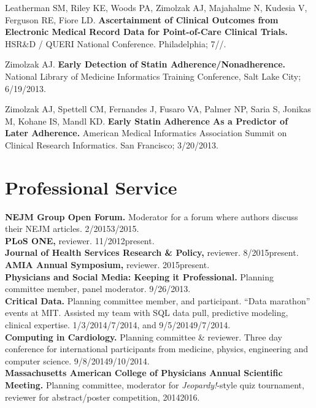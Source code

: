 \documentclass[10pt]{article}
\begin{document}
Leatherman SM, Riley KE, Woods PA, Zimolzak AJ, Majahalme N, Kudesia
V, Ferguson RE, Fiore LD. \textbf{Ascertainment of Clinical Outcomes
  from Electronic Medical Record Data for Point-of-Care Clinical
  Trials.} HSR\&D / QUERI National Conference. Philadelphia;
7/\ndash{}/.

Zimolzak AJ. \textbf{Early Detection of Statin
  Adherence/Nonadherence.} National Library of Medicine Informatics
Training Conference, Salt Lake City; 6/19/2013.

Zimolzak AJ, Spettell CM, Fernandes J, Fusaro VA, Palmer NP, Saria S,
Jonikas M, Kohane IS, Mandl KD. \textbf{Early Statin Adherence As a
  Predictor of Later Adherence.} American Medical Informatics
Association Summit on Clinical Research Informatics. San Francisco;
3/20/2013.

\section*{Professional Service}

\textbf{NEJM Group Open Forum.} Moderator for a forum where
authors discuss their NEJM articles. 2/2015\ndash{}3/2015.\\
\textbf{PLoS ONE,} reviewer. 11/2012\ndash{}present.\\
\textbf{Journal of Health Services Research \& Policy,} reviewer.
8/2015\ndash{}present.\\
\textbf{AMIA Annual Symposium,} reviewer. 2015\ndash{}present.\\
\textbf{Physicians and Social Media: Keeping it Professional.}
Planning committee member, panel moderator. 9/26/2013.\\
\textbf{Critical Data.} Planning committee member, and participant.
``Data marathon'' events at MIT. Assisted my team with SQL data pull,
predictive modeling, clinical expertise.
1/3/2014\ndash{}/7/2014, and 9/5/2014\ndash{}9/7/2014.\\
\textbf{Computing in Cardiology.} Planning committee \& reviewer.
Three day conference for international participants from medicine,
physics, engineering and computer science.
9/8/2014\ndash{}9/10/2014.\\
\textbf{Massachusetts American College of Physicians Annual Scientific
  Meeting.} Planning committee, moderator for \emph{Jeopardy!}-style
quiz tournament, reviewer for abstract/poster competition,
2014\ndash{}2016.
\end{document}
